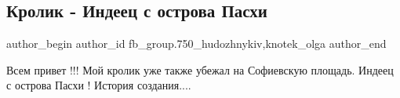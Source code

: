  
 
 
 
 

\subsection{Кролик - Индеец с острова Пасхи}
\label{sec:03_04_2018.fb.fb_group.750_hudozhnykiv.3.krolik_indeec_s_ostrova_pashi}
 
\ifcmt
 author_begin
   author_id fb_group.750_hudozhnykiv,knotek_olga
 author_end
\fi

Всем привет !!! Мой кролик уже также убежал на Софиевскую площадь. Индеец с
острова Пасхи ! История создания....

